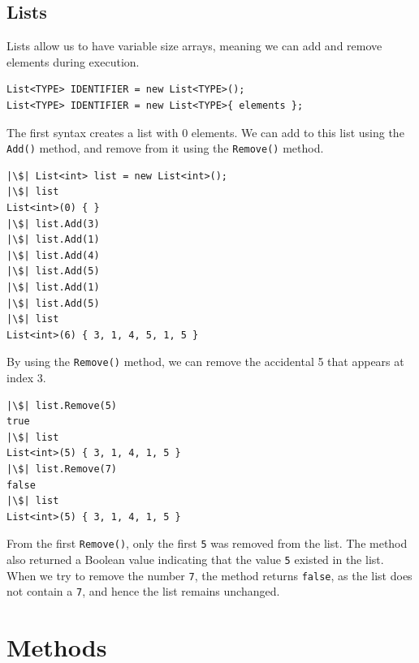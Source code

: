 \documentclass{article}
\begin{document}
\subsection{Lists}
Lists allow us to have variable size arrays, meaning we can add and
remove elements during execution.
\begin{verbatim}
List<TYPE> IDENTIFIER = new List<TYPE>();
List<TYPE> IDENTIFIER = new List<TYPE>{ elements };
\end{verbatim}
The first syntax creates a list with 0 elements. We can add to this
list using the \texttt{Add()} method, and remove from it
using the \texttt{Remove()} method.
\begin{verbatim}
|\$| List<int> list = new List<int>();
|\$| list
List<int>(0) { }
|\$| list.Add(3)
|\$| list.Add(1)
|\$| list.Add(4)
|\$| list.Add(5)
|\$| list.Add(1)
|\$| list.Add(5)
|\$| list
List<int>(6) { 3, 1, 4, 5, 1, 5 }
\end{verbatim}
By using the \texttt{Remove()} method, we can remove the
accidental 5 that appears at index 3.
\begin{verbatim}
|\$| list.Remove(5)
true
|\$| list
List<int>(5) { 3, 1, 4, 1, 5 }
|\$| list.Remove(7)
false
|\$| list
List<int>(5) { 3, 1, 4, 1, 5 }
\end{verbatim}
From the first \texttt{Remove()}, only the first
\texttt{5} was removed from the list. The method also
returned a Boolean value indicating that the value
\texttt{5} existed in the list. When we try to remove the
number \texttt{7}, the method returns
\texttt{false}, as the list does not contain a
\texttt{7}, and hence the list remains unchanged.
\section{Methods}\label{section:methods}
\end{document}
